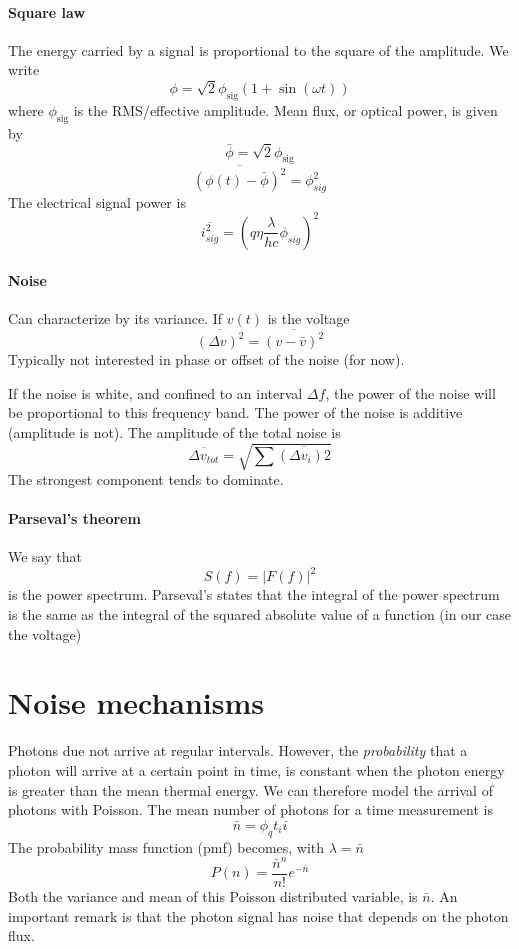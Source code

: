 \documentclass[article]{memoir}
\begin{document}
\paragraph{Square law}
The energy carried by a signal is proportional to the square of the amplitude.
We write
\[
    \phi = \sqrt 2 \phi_{\text{sig}}(1 + \sin({\omega t}))
\]
where \(\phi_{\text{sig}}\) is the RMS/effective amplitude.
Mean flux, or optical power, is given by
\[
    \bar{\phi} = \sqrt 2 \phi_{\text{sig}}
\]
\[
    \overline{(\phi(t) - \bar{\phi})^2} = \phi^2_{sig}
\]
The electrical signal power is
\[
    \overline{i_{sig}^2} = \left(q \eta \frac{\lambda}{hc}\phi_{sig}\right)^2
\]
\paragraph{Noise}
Can characterize by its variance. If \(v(t)\) is the voltage
\[
    \overline{(\Delta v)^2} = \overline{(v - \bar v)^2}
\]
Typically not interested in phase or offset of the noise (for now).

If the noise is white, and confined to an interval \(\Delta f\), the power of the noise will be proportional to this frequency band. The power of the noise is additive (amplitude is not). The amplitude of the total noise is
\[
    \overline{\Delta v_{tot}} = \sqrt{\sum \overline{(\Delta v_i)2}}
\]
The strongest component tends to dominate.

\paragraph{Parseval's theorem}
We say that
\[
    S(f) = \lvert F(f) \rvert^2
\]
is the power spectrum. Parseval's  states that the integral of the power spectrum is the same as the integral of the squared absolute value of a function (in our case the voltage)

\section{Noise mechanisms}

Photons due not arrive at regular intervals. However, the \emph{probability} that a photon will arrive at a certain point in time, is constant when the photon energy is greater than the mean thermal energy. We can therefore model the arrival of photons with Poisson. The mean number of photons for a time measurement is
\[
    \bar n = \phi_q t_ii
\]
The probability mass function (pmf) becomes, with \(\lambda = \bar n\)
\[
    P(n) = \frac{\bar n ^n}{n!}e^{- \bar n}
\]
Both the variance and mean of this Poisson distributed variable, is \(\bar n\). An important remark is that the photon signal has noise that depends on the photon flux.
\end{document}
